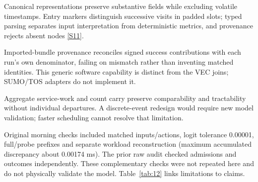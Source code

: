 \documentclass[11pt,a4paper]{article}
\begin{document}
Canonical representations preserve substantive fields while excluding volatile timestamps. Entry markers distinguish successive visits in padded slots; typed parsing separates input interpretation from deterministic metrics, and provenance rejects absent nodes \hyperref[source-s11]{[S11]}.

Imported-bundle provenance reconciles signed success contributions with each run's own denominator, failing on mismatch rather than inventing matched identities. This generic software capability is distinct from the VEC joins; SUMO/TOS adapters do not implement it.

Aggregate service-work and count carry preserve comparability and tractability without individual departures. A discrete-event redesign would require new model validation; faster scheduling cannot resolve that limitation.

Original morning checks included matched inputs/actions, logit tolerance 0.00001, full/probe prefixes and separate workload reconstruction (maximum accumulated discrepancy about 0.00174 ms). The prior raw audit checked admissions and outcomes independently. These complementary checks were not repeated here and do not physically validate the model. Table~\ref{tab:12} links limitations to claims.
\end{document}
